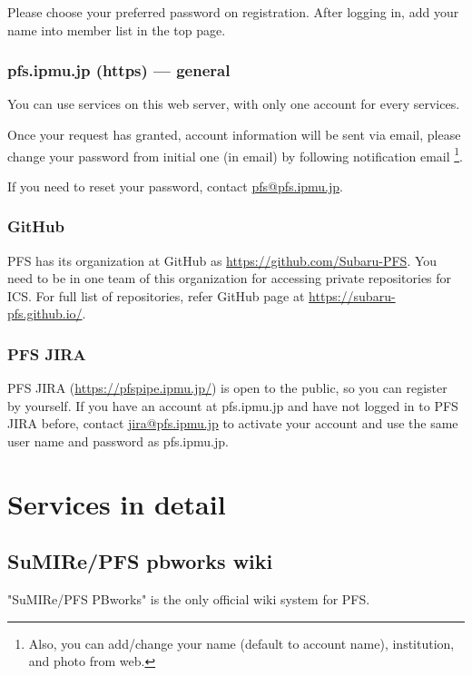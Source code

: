 \documentclass[a4paper,notitlepage]{article}
\begin{document}
Please choose your preferred password on registration. 
After logging in, add your name into member list in the top page. 

\subsubsection{pfs.ipmu.jp (https) --- general}

You can use services on this web server, with only one account for every 
services.

Once your request has granted, 
account information will be sent via email, please change your password 
from initial one (in email) by following notification email 
\footnote{Also, you can add/change your name (default to account name), 
institution, and photo from web.}. 

If you need to reset your password, contact \url{pfs@pfs.ipmu.jp}. 

\subsubsection{GitHub}

PFS has its organization at GitHub as \url{https://github.com/Subaru-PFS}. 
You need to be in one team of this organization for accessing private 
repositories for ICS. 
For full list of repositories, refer GitHub page at 
\url{https://subaru-pfs.github.io/}.

\subsubsection{PFS JIRA}

PFS JIRA (\url{https://pfspipe.ipmu.jp/}) is open to the public, 
so you can register by yourself. 
If you have an account at pfs.ipmu.jp and have not logged in to PFS JIRA 
before, contact \url{jira@pfs.ipmu.jp} to activate your account and use 
the same user name and password as pfs.ipmu.jp. 

\section{Services in detail}

\subsection{SuMIRe/PFS pbworks wiki}

"SuMIRe/PFS PBworks" is the only official wiki system for PFS. 
\end{document}

